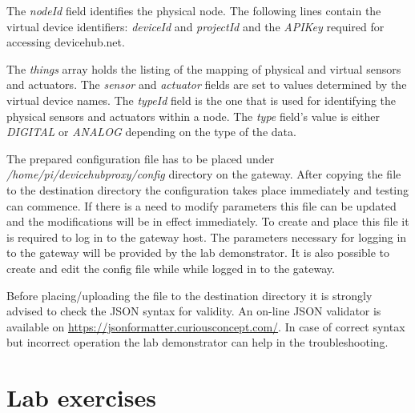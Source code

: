 \documentclass[a4paper]{article}
\begin{document}
The \emph{nodeId} field identifies the physical node. The following lines contain the virtual
device identifiers: \emph{deviceId} and \emph{projectId} and the \emph{APIKey} required for
accessing devicehub.net.

The \emph{things} array holds the listing of the mapping of physical and virtual sensors and
actuators. The \emph{sensor} and \emph{actuator} fields are set to values determined by the
virtual device names. The \emph{typeId} field is the one that is used for identifying the
physical sensors and actuators within a node. The \emph{type} field's value is either \emph{DIGITAL}
or \emph{ANALOG} depending on the type of the data.

The prepared configuration file has to be placed under \emph{/home/pi/devicehubproxy/config}
directory on the gateway. After copying the file to the destination directory the configuration
takes place immediately and testing can commence. If there is a need to modify parameters this
file can be updated and the modifications will be in effect immediately.
To create and place this file it is required to log in to the gateway host. The parameters necessary
for logging in to the gateway will be provided by the lab demonstrator. It is also possible
to create and edit the config file while while logged in to the gateway.

Before placing/uploading the file to the destination directory it is strongly advised to check
the JSON syntax for validity. An on-line JSON validator is available on \url{https://jsonformatter.curiousconcept.com/}.
In case of correct syntax but incorrect operation the lab demonstrator can help in the troubleshooting.

\appendix

\section{Lab exercises}
\end{document}
